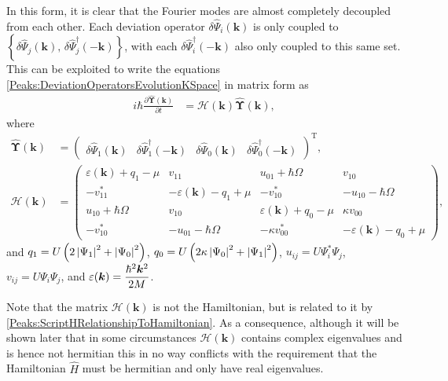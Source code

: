 In this form, it is clear that the Fourier modes are almost completely decoupled from each other. Each deviation operator $\delta\hat{\Psi}_i(\bm{k})$ is only coupled to $\left\{\delta\hat{\Psi}_j(\bm{k}),\, \delta\hat{\Psi}_j^\dagger(-\bm{k})\right\}$, with each $\delta\hat{\Psi}_i^\dagger(-\bm{k})$ also only coupled to this same set. This can be exploited to write the equations \eqref{Peaks:DeviationOperatorsEvolutionKSpace} in matrix form as
\begin{align}
    \label{Peaks:DeviationOperatorsMatrixEvolution}
    i \hbar \frac{\partial \hat{\bm{\Upsilon}}(\bm{k})}{\partial t} &= \mathcal{H}(\bm{k}) \hat{\bm{\Upsilon}}(\bm{k}),
\end{align}
where
\begin{align}
    \hat{\bm{\Upsilon}}(\bm{k}) &= 
    \begin{pmatrix}
        \delta\hat{\Psi}_1(\bm{k}) &
        \delta\hat{\Psi}_1^\dagger(-\bm{k}) &
        \delta\hat{\Psi}_0(\bm{k}) &
        \delta\hat{\Psi}_0^\dagger(-\bm{k})
    \end{pmatrix}^\text{T},\\
    \mathcal{H}(\bm{k}) &= 
    \begin{pmatrix}
        \varepsilon(\bm{k}) + q_{1} - \mu & v_{11} & u_{01} + \hbar \Omega & v_{10}\\
        -v_{11}^* & -\varepsilon(\bm{k}) - q_1 + \mu & -v_{10}^* & -u_{10} - \hbar \Omega\\
        u_{10} + \hbar \Omega & v_{10} & \varepsilon(\bm{k}) + q_0 - \mu & \kappa v_{00}\\
        -v_{10}^* & -u_{01} - \hbar \Omega & -\kappa v_{00}^* & -\varepsilon(\bm{k}) - q_0 + \mu
    \end{pmatrix},\label{Peaks:HMatrix}
\end{align}
and $q_1 = U\left(2\left|\Psi_1\right|^2+\left|\Psi_0\right|^2\right)$, $q_0 = U\left(2\kappa \left|\Psi_0\right|^2 + \left|\Psi_1\right|^2\right)$, $u_{ij} = U\Psi_i^*\Psi_j$, $v_{ij} = U\Psi_i\Psi_j$, and $\displaystyle \protect{\varepsilon(\bm{k}) = \frac{\hbar^2 \bm{k}^2}{2M}}$.

Note that the matrix $\mathcal{H}(\bm{k})$ is not the Hamiltonian, but is related to it by \eqref{Peaks:ScriptHRelationshipToHamiltonian}. As a consequence, although it will be shown later that in some circumstances $\mathcal{H}(\bm{k})$ contains complex eigenvalues and is hence not hermitian this in no way conflicts with the requirement that the Hamiltonian $\hat{H}$ must be hermitian and only have real eigenvalues.

